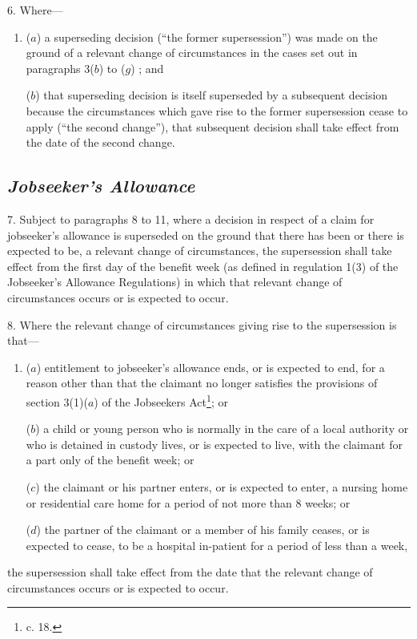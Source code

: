 \documentclass[12pt,a4paper]{article}
\begin{document}
6.  Where—
\begin{enumerate}\item[]
($a$) a superseding decision (“the former supersession”) was made on the ground of a relevant change of circumstances in the cases set out in paragraphs 3($b$)  to ($g$) ; and

($b$) that superseding decision is itself superseded by a subsequent decision because the circumstances which gave rise to the former supersession cease to apply (“the second change”), that subsequent decision shall take effect from the date of the second change.
\end{enumerate}

\subsection*{\itshape Jobseeker’s Allowance}

7.  Subject to paragraphs 8 to 11, where a decision in respect of a claim for jobseeker’s allowance is superseded on the ground that there has been or there is expected to be, a relevant change of circumstances, the supersession shall take effect from the first day of the benefit week (as defined in regulation 1(3) of the Jobseeker’s Allowance Regulations) in which that relevant change of circumstances occurs or is expected to occur.

\medskip

8.  Where the relevant change of circumstances giving rise to the supersession is that—
\begin{enumerate}\item[]
($a$) entitlement to jobseeker’s allowance ends, or is expected to end, for a reason other than that the claimant no longer satisfies the provisions of section 3(1)($a$)  of the Jobseekers Act\footnote{ c. 18.}; or

($b$) a child or young person who is normally in the care of a local authority or who is detained in custody lives, or is expected to live, with the claimant for a part only of the benefit week; or

($c$) the claimant or his partner enters, or is expected to enter, a nursing home or residential care home for a period of not more than 8 weeks; or

($d$) the partner of the claimant or a member of his family ceases, or is expected to cease, to be a hospital in-patient for a period of less than a week,
\end{enumerate}
the supersession shall take effect from the date that the relevant change of circumstances occurs or is expected to occur.
\end{document}

